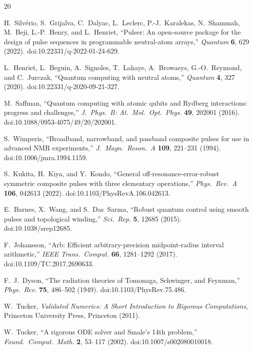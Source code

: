 \begin{thebibliography}{20}\small\raggedright\sloppy

H.~Silv\'erio, S.~Grijalva, C.~Dalyac, L.~Leclerc, P.-J.~Karalekas, N.~Shammah, M.~Beji,
L.-P.~Henry, and L.~Henriet, ``Pulser: An open-source package for the design of pulse
sequences in programmable neutral-atom arrays,'' \emph{Quantum} \textbf{6}, 629 (2022).
doi:10.22331/q-2022-01-24-629.

L.~Henriet, L.~Beguin, A.~Signoles, T.~Lahaye, A.~Browaeys, G.-O.~Reymond, and
C.~Jurczak, ``Quantum computing with neutral atoms,'' \emph{Quantum} \textbf{4}, 327
(2020). doi:10.22331/q-2020-09-21-327.

M.~Saffman, ``Quantum computing with atomic qubits and Rydberg interactions: progress and
challenges,'' \emph{J.~Phys.~B: At.~Mol.~Opt.~Phys.} \textbf{49}, 202001 (2016).
doi:10.1088/0953-4075/49/20/202001.

S.~Wimperis, ``Broadband, narrowband, and passband composite pulses for use in advanced
NMR experiments,'' \emph{J.~Magn.~Reson.~A} \textbf{109}, 221--231 (1994).
doi:10.1006/jmra.1994.1159.

S.~Kukita, H.~Kiya, and Y.~Kondo, ``General off-resonance-error-robust symmetric composite
pulses with three elementary operations,'' \emph{Phys.~Rev.~A} \textbf{106}, 042613 (2022).
doi:10.1103/PhysRevA.106.042613.

E.~Barnes, X.~Wang, and S.~Das~Sarma, ``Robust quantum control using smooth pulses and
topological winding,'' \emph{Sci.~Rep.} \textbf{5}, 12685 (2015). doi:10.1038/srep12685.

F.~Johansson, ``Arb: Efficient arbitrary-precision midpoint-radius interval arithmetic,''
\emph{IEEE Trans.~Comput.} \textbf{66}, 1281--1292 (2017). doi:10.1109/TC.2017.2690633.

F.~J.~Dyson, ``The radiation theories of Tomonaga, Schwinger, and Feynman,''
\emph{Phys.~Rev.} \textbf{75}, 486--502 (1949). doi:10.1103/PhysRev.75.486.

W.~Tucker, \emph{Validated Numerics: A Short Introduction to Rigorous Computations},
Princeton University Press, Princeton (2011).

W.~Tucker, ``A rigorous ODE solver and Smale's 14th problem,'' \emph{Found.~Comput.~Math.}
\textbf{2}, 53--117 (2002). doi:10.1007/s002080010018.


\end{thebibliography}

